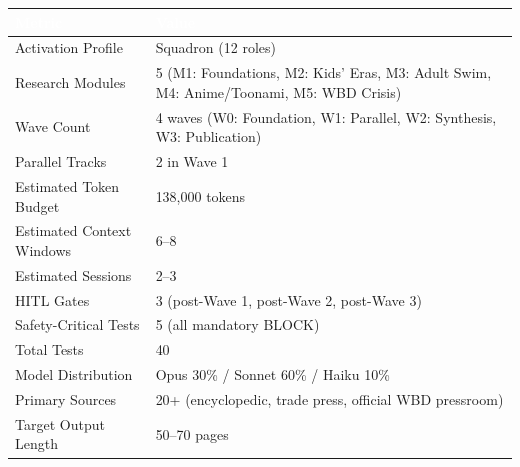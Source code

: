\documentclass[11pt,letterpaper]{article}
\newcommand{\tableheader}[1]{\textbf{\sffamily\textcolor{white}{#1}}}
\begin{document}
\begin{center}
\begin{tabularx}{\textwidth}{L{5cm}X}
\toprule
{}
\tableheader{Metric} & \tableheader{Value} \\
\midrule
Activation Profile & Squadron (12 roles) \\
Research Modules & 5 (M1: Foundations, M2: Kids' Eras, M3: Adult Swim, M4: Anime/Toonami, M5: WBD Crisis) \\
Wave Count & 4 waves (W0: Foundation, W1: Parallel, W2: Synthesis, W3: Publication) \\
Parallel Tracks & 2 in Wave 1 \\
Estimated Token Budget & 138,000 tokens \\
Estimated Context Windows & 6--8 \\
Estimated Sessions & 2--3 \\
HITL Gates & 3 (post-Wave 1, post-Wave 2, post-Wave 3) \\
Safety-Critical Tests & 5 (all mandatory BLOCK) \\
Total Tests & 40 \\
Model Distribution & Opus 30\% / Sonnet 60\% / Haiku 10\% \\
Primary Sources & 20+ (encyclopedic, trade press, official WBD pressroom) \\
Target Output Length & 50--70 pages \\
\bottomrule
\end{tabularx}
\end{center}

\vspace{2em}
\end{document}
